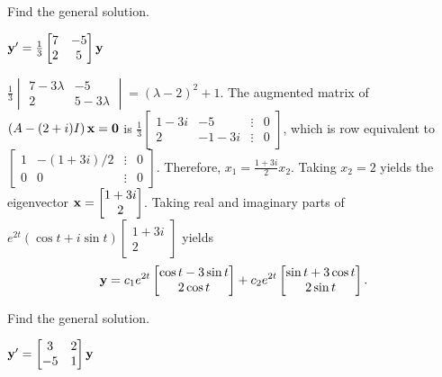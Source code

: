 \documentclass{ximera}
\begin{document}
  \begin{problem}\label{exer:10.6.10} 
  Find the general solution.
  
  $ {\bf
y}'=\frac{1}{3} \begin{bmatrix}7&-5\\2&5\end{bmatrix}{\bf y}$

\begin{solution}
    $\frac{1 }{3}\begin{vmatrix}7-3\lambda&-5\\2&5-3\lambda
\end{vmatrix}= \left(\lambda-2\right)^2+1$.
The augmented matrix of
$ \left(A-(2+i)I\right){\bf x}={\bf 0}$ is
$\frac{1 }{3} \begin{bmatrix}1-3i&-5&\vdots&0\\2&-1-3i&\vdots&0
 \end{bmatrix}$, which is row equivalent to
$ \begin{bmatrix} 1&-(1+3i)/2&\vdots&0\\ 0&0&\vdots&0
 \end{bmatrix}$. Therefore,  $x_1=\frac{1+3i }{2}x_2$. Taking
$x_2=2$ yields the eigenvector
${\bf x}= \begin{bmatrix}1+3i\\2 \end{bmatrix}$.
 Taking real and imaginary parts of
$e^{2t}(\cos t+i\sin t)
 \begin{bmatrix}1+3i\\2 \end{bmatrix}$
yields
$$
 {\bf y}=c_1e^{2t} \begin{bmatrix}\cos t-3\sin t
\\2\cos t \end{bmatrix}+
c_2e^{2t} \begin{bmatrix}
\sin t+3\cos t\\ 2\sin t \end{bmatrix}.
$$

\end{solution}
\end{problem}
 

 \begin{problem}\label{exer:10.6.11} 
 Find the general solution.
 
 $ {\bf y}'= \begin{bmatrix}3&2\\-5&1\end{bmatrix}{\bf y}$
 \end{problem}
\end{document}
